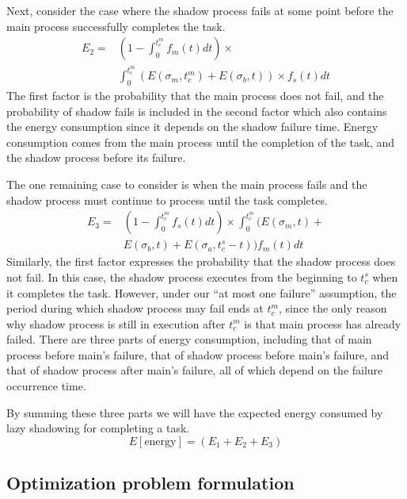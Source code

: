 Next, consider the case where the shadow process fails at some point
before the main process successfully completes the task.
\begin{equation}
\begin{split}
E_2 = & (1-\int_0^{t_c^m}f_m(t)dt) \times \\
      & \int_0^{t_c^m}(E(\sigma_m,t_c^m)+E(\sigma_b,t)) \times f_s(t)dt
\label{eq:energy_shadow_fail}
\end{split}
\end{equation}
The first factor is the probability that the main process does not
fail, and the probability of shadow fails is included in the second factor which also contains the energy consumption since it depends on the shadow failure time. Energy consumption comes from the main process until the completion of the task,
and the shadow process before its failure.

The one remaining case to consider is when the main process fails and
the shadow process must continue to process until the task completes.
\begin{equation}
\begin{split}
E_3 = & (1-\int_0^{t_c^m}f_s(t)dt) \times \int_0^{t_c^m}(E(\sigma_m,t)+\\
      & E(\sigma_b,t)+E(\sigma_a,t_c^s-t))f_m(t)dt
\label{eq:energy_main_fail}
\end{split}
\end{equation}
Similarly, the first factor expresses the probability that the shadow process does
not fail. In this case, the shadow process executes from the beginning to
$t_c^s$ when it completes the task. However, under our ``at most one
failure'' assumption, the period during which shadow process may fail
ends at $t_c^m$, since the only reason why shadow process is still in
execution after $t_c^m$ is that main process has already failed. There
are three parts of energy consumption, including that of main process
before main's failure, that of shadow process before main's failure,
and that of shadow process after main's failure, all of which depend
on the failure occurrence time. 

By summing these three parts we will have
the expected energy consumed by lazy shadowing for completing a
task.
\begin{equation}
E[\text{energy}]= (E_1 + E_2 + E_3)
\label{eq:total_energy}
\end{equation}

\subsection{Optimization problem formulation}\

